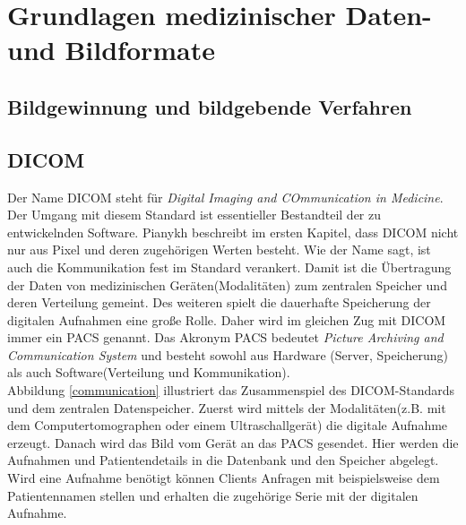 \chapter{Grundlagen medizinischer Daten- und Bildformate} \label{grundlagen}

\section{Bildgewinnung und bildgebende Verfahren}\label{grundlagen:bildgebung}

\section{DICOM}\label{grundlagen:dicom}
Der Name DICOM steht für \textit{Digital Imaging and COmmunication in Medicine}. Der Umgang mit diesem Standard ist essentieller Bestandteil der zu entwickelnden Software. Pianykh\cite{pianykh:dicom} beschreibt im ersten Kapitel, dass DICOM nicht nur aus Pixel und deren zugehörigen Werten besteht. Wie der Name sagt, ist auch die Kommunikation fest im Standard verankert. Damit ist die Übertragung der Daten von medizinischen Geräten(Modalitäten) zum zentralen Speicher und deren Verteilung gemeint. Des weiteren spielt die dauerhafte Speicherung der digitalen Aufnahmen eine große Rolle. Daher wird im gleichen Zug mit DICOM immer ein PACS genannt. Das Akronym PACS bedeutet \textit{Picture Archiving and Communication System} und besteht sowohl aus Hardware (Server, Speicherung) als auch Software(Verteilung und Kommunikation).\\
Abbildung \ref{communication} illustriert das Zusammenspiel des DICOM-Standards und dem zentralen Datenspeicher. Zuerst wird mittels der Modalitäten(z.B. mit dem Computertomographen oder einem Ultraschallgerät) die digitale Aufnahme erzeugt. Danach wird das Bild vom Gerät an das PACS gesendet. Hier werden die Aufnahmen und Patientendetails in die Datenbank und den Speicher abgelegt. Wird eine Aufnahme benötigt können Clients Anfragen mit beispielsweise dem Patientennamen stellen und erhalten die zugehörige Serie mit der digitalen Aufnahme.

